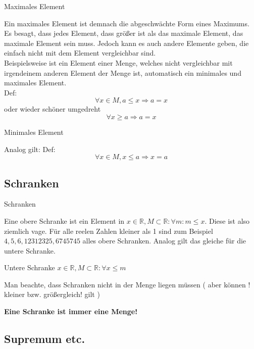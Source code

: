 \documentclass[headsepline,12pt,a4paper]{scrartcl}
\begin{document}
\newpage

\begin{center}
\item[Maximales Element]
\end{center}
\item Ein maximales Element ist demnach die abgeschwächte Form eines Maximums. Es besagt, dass jedes Element, dass größer ist als das maximale Element, das maximale Element sein muss. Jedoch kann es auch andere Elemente geben, die einfach nicht mit dem Element vergleichbar sind. \\
Beispielsweise ist ein Element einer Menge, welches nicht vergleichbar mit irgendeinem anderen Element der Menge ist, automatisch ein minimales und maximales Element. \\
 Def: $$ \forall x \in M , a \leq x \Rightarrow a = x $$
 oder wieder schöner umgedreht $$ \forall x \geq a \Rightarrow a = x $$

\begin{center}
\item[Minimales Element]
\end{center}
\item Analog gilt: Def: $$ \forall x \in M, x \leq a \Rightarrow x = a $$

\newpage

\subsection*{Schranken}

\begin{center}
\item[Schranken]
\end{center}
\item Eine obere Schranke ist ein Element in $ x \in \mathbb{R}, M \subset \mathbb{R} : \forall m : m \leq x $. Diese ist also ziemlich vage. Für alle reelen Zahlen kleiner als 1 sind zum Beispiel $ 4,5,6,12312325,6745745 $ alles obere Schranken. Analog gilt das gleiche für die untere Schranke.
\item Untere Schranke $ x \in \mathbb{R}, M \subset \mathbb{R} : \forall x \leq m $
\item Man beachte, dass Schranken nicht in der Menge liegen müssen ( aber können ! kleiner bzw. größergleich! gilt )
\item \textbf{Eine Schranke ist immer eine Menge!}

\subsection*{Supremum etc.}
\end{document}
